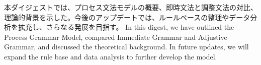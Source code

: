 \documentclass[a4paper,xelatex,ja=standard]{bxjsarticle}
\begin{document}
\ifJPN
本ダイジェストでは、プロセス文法モデルの概要、即時文法と調整文法の対比、理論的背景を示した。今後のアップデートでは、ルールベースの整理やデータ分析を拡充し、さらなる発展を目指す。
\else
In this digest, we have outlined the Process Grammar Model, compared Immediate Grammar and Adjustive Grammar, and discussed the theoretical background. In future updates, we will expand the rule base and data analysis to further develop the model.
\fi

\appendix




\printbibliography
\end{document}
